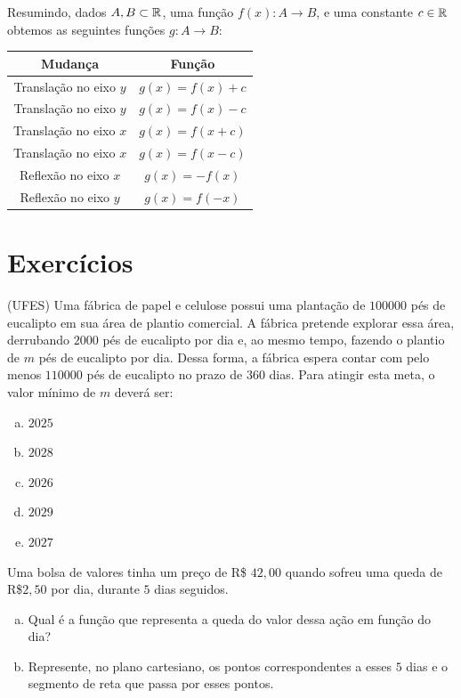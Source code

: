  Resumindo, dados $A, B \subset \mathbb{R}$, uma função $f(x): A \to B$, e uma constante $c \in \mathbb{R}$ obtemos as seguintes funções $g: A \to B$:
  \begin{table}[H]
 \centering
 \begin{tabular}{|c|c|} \hline
 \rowcolor{cinza}
  Mudança & Função \\\hline
  Translação no eixo $y$ & $g(x)= f(x)+ c$ \\\hline
  Translação no eixo $y$ & $g(x)= f(x)- c$ \\\hline
  Translação no eixo $x$ & $g(x)= f(x+ c)$ \\\hline
  Translação no eixo $x$ & $g(x)= f(x- c)$ \\\hline
  Reflexão no eixo $x$ & $g(x)= -f(x)$ \\\hline
  Reflexão no eixo $y$ & $g(x)= f(-x)$ \\\hline
 \end{tabular}
\end{table}

 \section{Exercícios}
  \begin{exer}
  (UFES) Uma fábrica de papel e celulose possui uma plantação de $100000$ pés de eucalipto em sua área de plantio comercial. A fábrica pretende explorar essa área, derrubando $2000$ pés de eucalipto por dia e, ao mesmo tempo, fazendo o plantio de $m$ pés de eucalipto por dia. Dessa forma, a fábrica espera contar com pelo menos $110000$ pés de eucalipto no prazo de $360$ dias. Para atingir esta meta, o valor mínimo de $m$ deverá ser:
  \begin{enumerate}[a)]
  \item $2025$
  \item $2028$
  \item $2026$
  \item $2029$
  \item $2027$
  \end{enumerate}
  \end{exer}
 
 \begin{exer}
 Uma bolsa de valores tinha um preço de R\$ $42,00$ quando sofreu uma queda de R\$$2,50$ por dia, durante $5$ dias seguidos.
  \begin{enumerate}[a)]
  \item Qual é a função que representa a queda do valor dessa ação em função do dia?
  \item Represente, no plano cartesiano, os pontos correspondentes a esses $5$ dias e o segmento de reta que passa por esses pontos.
  \end{enumerate}
  \end{exer}
  
